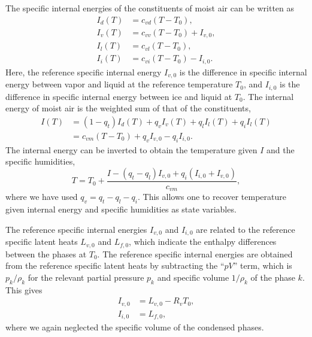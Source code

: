 \documentclass{report}
\begin{document}
The specific internal energies of the constituents of moist air can be written as
\begin{subequations}\label{e:internal_energies}
\begin{align}
I_d(T) & = c_{vd} (T - T_0),  \\
I_v(T) & = c_{vv} (T - T_0) + I_{v,0},\\
I_l(T) & = c_{vl} (T - T_0), \\
I_i(T) & = c_{vi} (T - T_0) - I_{i,0}.
\end{align}
\end{subequations}
Here, the reference specific internal energy $I_{v,0}$ is the difference in specific internal energy between vapor and liquid at the reference temperature $T_0$, and $I_{i,0}$ is the difference in specific internal energy between ice and liquid at $T_0$. The internal energy of moist air is the weighted sum of that of the constituents,
\begin{equation}
\begin{split}
     I(T) & = (1-q_t) I_d(T) + q_v I_v(T) + q_l I_l(T) + q_i I_l(T)\\
          & = c_{vm} (T - T_0)  + q_v I_{v,0} - q_i I_{i,0}.
     \label{eq:total_internal_energy}
\end{split}
\end{equation}
The internal energy can be inverted to obtain the temperature given $I$ and the specific humidities,
\begin{equation}
    T = T_0 + \frac{I - (q_t - q_l) I_{v,0} + q_i (I_{i,0} + I_{v,0})}{c_{vm}},
    \label{eq:temperature}
\end{equation}
where we have used $q_v = q_t - q_l - q_i$. This allows one to recover temperature given internal energy and specific humidities as state variables.

The reference specific internal energies $I_{v,0}$ and $I_{i,0}$ are related to the reference specific latent heats $L_{v,0}$ and $L_{f,0}$, which indicate the enthalpy differences between the phases at $T_0$. The reference specific internal energies are obtained from the reference specific latent heats by subtracting the ``$pV$'' term, which is $p_k/\rho_k$ for the relevant partial pressure $p_k$ and specific volume $1/\rho_k$ of the phase $k$. This gives
\begin{subequations}\label{e:ref_internal_energies}
\begin{align}
     I_{v,0} &= L_{v, 0} - R_v T_0,\\
     I_{i,0} &= L_{f, 0},
\end{align}
\end{subequations}
where we again neglected the specific volume of the condensed phases. 
   
\end{document}
